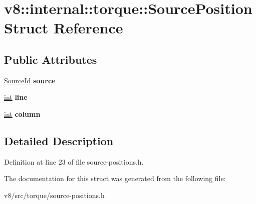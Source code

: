 \hypertarget{structv8_1_1internal_1_1torque_1_1SourcePosition}{}\section{v8\+:\+:internal\+:\+:torque\+:\+:Source\+Position Struct Reference}
\label{structv8_1_1internal_1_1torque_1_1SourcePosition}
\subsection*{Public Attributes}
\begin{DoxyCompactItemize}
\item 
\mbox{\label{structv8_1_1internal_1_1torque_1_1SourcePosition_addb1b5d43752a26232a52ff0e1c000c5}} 
\mbox{\hyperlink{classv8_1_1internal_1_1torque_1_1SourceId}{Source\+Id}} {\bfseries source}
\item 
\mbox{\label{structv8_1_1internal_1_1torque_1_1SourcePosition_a24e87a3dbaa2f3bbc8f4fcad805f1282}} 
\mbox{\hyperlink{classint}{int}} {\bfseries line}
\item 
\mbox{\label{structv8_1_1internal_1_1torque_1_1SourcePosition_a50b956471b2ab3e56414362b3e4dab22}} 
\mbox{\hyperlink{classint}{int}} {\bfseries column}
\end{DoxyCompactItemize}


\subsection{Detailed Description}


Definition at line 23 of file source-\/positions.\+h.



The documentation for this struct was generated from the following file\+:\begin{DoxyCompactItemize}
\item 
v8/src/torque/source-\/positions.\+h\end{DoxyCompactItemize}
